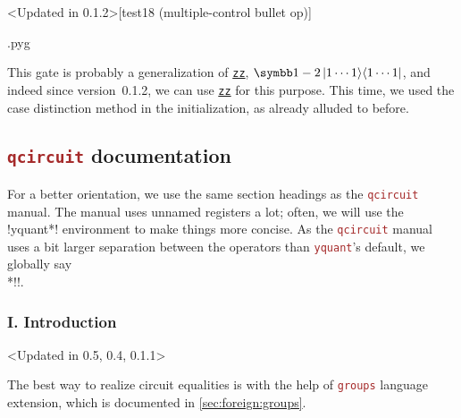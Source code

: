\documentclass{scrartcl}
\makeatletter
\newenvironment{codeexample}{%
   \VerbatimEnvironment%
   \let\FVB@VerbatimOut\minted@FVB@VerbatimOut
   \let\FVE@VerbatimOut\minted@FVE@VerbatimOut
   \minted@configlang{tex}%
   \minted@fvset
   \begin{VerbatimOut}[codes={\catcode`\^^I=12},firstline,lastline]{\minted@jobname.pyg}%
}{
   \end{VerbatimOut}%
   \minted@langlinenoson%
   \savebox\codeexamplebox{ \minted@jobname.pyg}%
   \ifdim\wd\codeexamplebox>\dimexpr.5\linewidth-3mm\relax%
      \wd\codeexamplebox=.5\linewidth%
   \else%
      \wd\codeexamplebox=\dimexpr\wd\codeexamplebox+3mm\relax%
   \fi%
   \noindent\begin{minipage}{\wd\codeexamplebox}%
      \centering%
      \usebox\codeexamplebox%
   \end{minipage}%
   \begin{minipage}{\dimexpr\linewidth-\wd\codeexamplebox\relax}%
      \expandafter\minted@pygmentize\expandafter{\minted@lang}%
   \end{minipage}%
   \minted@langlinenosoff%
   \par%
}
\newenvironment{codeexample*}{%
   \VerbatimEnvironment%
   \let\FVB@VerbatimOut\minted@FVB@VerbatimOut
   \let\FVE@VerbatimOut\minted@FVE@VerbatimOut
   \minted@configlang{tex}%
   \minted@fvset
   \begin{VerbatimOut}[codes={\catcode`\^^I=12},firstline,lastline]{\minted@jobname.pyg}%
}{
   \end{VerbatimOut}%
   \minted@langlinenoson%
   \begin{adjustbox}{center}
       \minted@jobname.pyg %
   \end{adjustbox}\nopagebreak
   \expandafter\minted@pygmentize\expandafter{\minted@lang}%
   \minted@langlinenosoff%
   \par%
}
\def\pkg#1{\textcolor{brown}{\texttt{#1}}}
\def\gate#1{\hyperref[gate:#1]{\texttt{#1}}}
\def\Yquant{\pkg{yquant}}
\def\ketbra#1#2{\ket{#1}\!\bra{#2}}
\makeatother
\begin{document}
         \begin{example}<Updated in 0.1.2>[test18 (multiple-control bullet op)]
            \begin{codeexample}
            \end{codeexample}
            This gate is probably a generalization of \gate{zz}, $\symbb1 - 2 \ketbra{1\dotsm1}{1\dotsm1}$, and indeed since version~0.1.2, we can use \gate{zz} for this purpose.
            This time, we used the case distinction method in the initialization, as already alluded to before.
         \end{example}
      \endgroup

      \clearpage
      \subsection{\pkg{qcircuit} documentation}
      \begingroup%
         For a better orientation, we use the same section headings as the \pkg{qcircuit} manual.
         The manual uses unnamed registers a lot; often, we will use the \tex!yquant*! environment to make things more concise.
         As the \pkg{qcircuit} manual uses a bit larger separation between the operators than \Yquant's default, we globally say\\*\tex!!.

         \subsubsection{I. Introduction}
            \begin{example}<Updated in 0.5, 0.4, 0.1.1>%
               \begin{codeexample*}
\begin{yquantgroup}
   \equals
\end{yquantgroup}
               \end{codeexample*}
               The best way to realize circuit equalities is with the help of \pkg{groups} language extension, which is documented in \cref{sec:foreign:groups}.
            \end{example}
\end{document}
